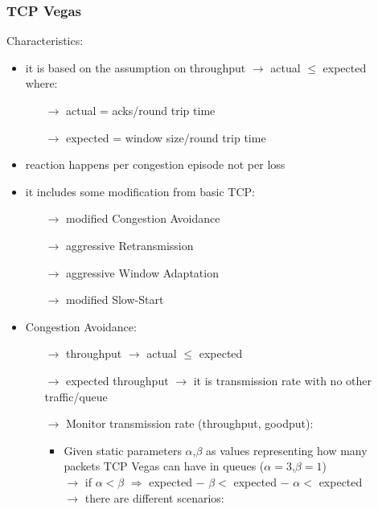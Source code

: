 \subsubsection{TCP Vegas}
Characteristics:
\begin{itemize}
    \item it is based on the assumption on throughput $\rightarrow$ actual $\leq$ expected\\
    where:
    \begin{itemize}
        \item[$\rightarrow$] actual = acks/round trip time
        \item[$\rightarrow$] expected = window size/round trip time
    \end{itemize} 
    \item reaction happens per congestion episode not per loss
    \item it includes some modification from basic TCP:
    \begin{itemize}
        \item[$\rightarrow$] modified Congestion Avoidance
        \item[$\rightarrow$] aggressive Retransmission
        \item[$\rightarrow$] aggressive Window Adaptation
        \item[$\rightarrow$] modified Slow-Start
    \end{itemize}
    \item Congestion Avoidance:
    \begin{itemize}
        \item[$\rightarrow$] throughput $\rightarrow$ actual $\leq$ expected
        \item[$\rightarrow$] expected throughput $\rightarrow$ it is transmission rate with no other traffic/queue
        \item[$\rightarrow$] Monitor transmission rate (throughput, goodput):
        \begin{itemize}
            \item Given static parameters $\alpha$,$\beta$ as values representing how many\\packets TCP Vegas can have in queues
            ($\alpha = 3$,$\beta = 1$)\\[0.15cm]
            $\rightarrow$ if $\alpha < \beta$
                $\Rightarrow$ expected $-$ $\beta <$ expected $-$ $\alpha <$ expected\\[0.15cm]
                $\rightarrow$ there are different scenarios:
            \begin{itemize}

\end{itemize}
\end{itemize}
\end{itemize}
\end{itemize}
